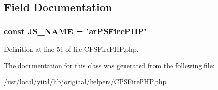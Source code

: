 \subsection{Field Documentation}
\hypertarget{classCPSFirePHP_a1ae5abc3ad17654100e3ade1df460965}{
\subsubsection[{JS\_\-NAME}]{\setlength{\rightskip}{0pt plus 5cm}const {\bf JS\_\-NAME} = 'arPSFirePHP'}}
\label{classCPSFirePHP_a1ae5abc3ad17654100e3ade1df460965}


Definition at line 51 of file CPSFirePHP.php.



The documentation for this class was generated from the following file:\begin{DoxyCompactItemize}
\item 
/usr/local/yiixl/lib/original/helpers/\hyperlink{CPSFirePHP_8php}{CPSFirePHP.php}\end{DoxyCompactItemize}
